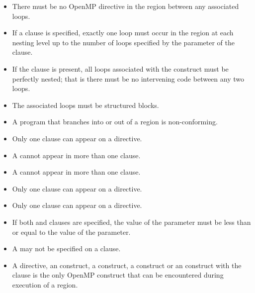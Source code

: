 \restrictions
\begin{itemize}
\item There must be no OpenMP directive in the region between any
associated loops.

\item If a  clause is specified, exactly one loop must
occur in the region at each nesting level up to the number of loops
specified by the parameter of the  clause.

\item If the  clause is present, all loops associated
with the construct must be perfectly nested; that is there must be
no intervening code between any two loops.

\item The associated loops must be structured blocks.

\item A program that branches into or out of a  region is non-conforming.

\item Only one  clause can appear on a  directive.

\item A  cannot appear in more than one  clause.

\item A  cannot appear in more than one  clause.

\item Only one  clause can appear on a  directive.

\item Only one  clause can appear on a  directive.

\item If both  and  clauses are specified, the value of the  parameter must be less than or equal to the value of the  parameter.

\item A  may not be specified on a  clause.

\item A  directive, an  construct, a 
construct, a  construct or an  construct with the
 clause is the only OpenMP construct that can be encountered
during execution of a  region.


\end{itemize}
